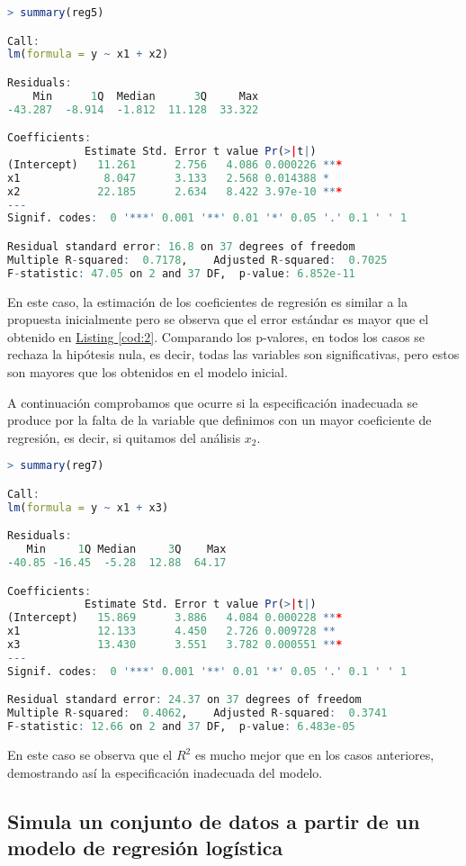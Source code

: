 \documentclass[12pt,a4paper]{article}
\begin{document}
\begin{lstlisting}[language=R, caption = Especificación inadecuada del modelo, label =cod:6]
> summary(reg5)  

Call:
lm(formula = y ~ x1 + x2)

Residuals:
    Min      1Q  Median      3Q     Max 
-43.287  -8.914  -1.812  11.128  33.322 

Coefficients:
            Estimate Std. Error t value Pr(>|t|)    
(Intercept)   11.261      2.756   4.086 0.000226 ***
x1             8.047      3.133   2.568 0.014388 *  
x2            22.185      2.634   8.422 3.97e-10 ***
---
Signif. codes:  0 '***' 0.001 '**' 0.01 '*' 0.05 '.' 0.1 ' ' 1

Residual standard error: 16.8 on 37 degrees of freedom
Multiple R-squared:  0.7178,	Adjusted R-squared:  0.7025 
F-statistic: 47.05 on 2 and 37 DF,  p-value: 6.852e-11
\end{lstlisting}
En este caso, la estimación de los coeficientes de regresión es similar a la propuesta inicialmente pero se observa que el error estándar es mayor que el obtenido en \hyperref[cod:2]{Listing \ref{cod:2}}. Comparando los p-valores, en todos los casos se rechaza la hipótesis nula, es decir, todas las variables son significativas, pero estos son mayores que los obtenidos en el modelo inicial.

A continuación comprobamos que ocurre si la especificación inadecuada se produce por la falta de la variable que definimos con un mayor coeficiente de regresión, es decir, si quitamos del análisis $x_2$.

\begin{lstlisting}[language=R, caption = Especificación inadecuada del modelo, label =cod:7]
> summary(reg7)

Call:
lm(formula = y ~ x1 + x3)

Residuals:
   Min     1Q Median     3Q    Max 
-40.85 -16.45  -5.28  12.88  64.17 

Coefficients:
            Estimate Std. Error t value Pr(>|t|)    
(Intercept)   15.869      3.886   4.084 0.000228 ***
x1            12.133      4.450   2.726 0.009728 ** 
x3            13.430      3.551   3.782 0.000551 ***
---
Signif. codes:  0 '***' 0.001 '**' 0.01 '*' 0.05 '.' 0.1 ' ' 1

Residual standard error: 24.37 on 37 degrees of freedom
Multiple R-squared:  0.4062,	Adjusted R-squared:  0.3741 
F-statistic: 12.66 on 2 and 37 DF,  p-value: 6.483e-05
\end{lstlisting}
En este caso se observa que el $R^2$ es mucho mejor que en los casos anteriores, demostrando así la especificación inadecuada del modelo.

\subsection{Simula un conjunto de datos a partir de un modelo de regresión logística}
\end{document}
